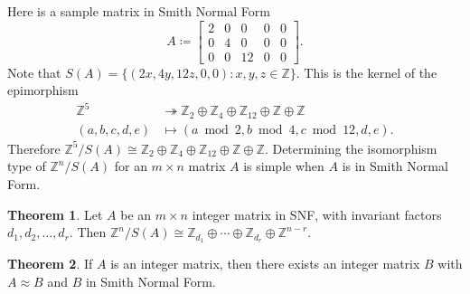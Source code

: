 \documentclass[12pt,a4paper,answers]{exam}
\newcommand{\Z}{\mathbb{Z}}
\theoremstyle{definition}
\newtheorem{theorem}{Theorem}[section]
\begin{document}
Here is a sample matrix in Smith Normal Form
\[ A \coloneqq
  \begin{bmatrix}
    2 & 0 & 0 & 0 & 0 \\
    0 & 4 & 0 & 0 & 0 \\
    0 & 0 & 12 & 0 & 0
  \end{bmatrix}.
\]
Note that $S(A)=\{(2x,4y,12z,0,0) : x,y,z\in\Z\}$. This is the kernel of the epimorphism
\begin{align*}
  \Z^5 &\twoheadrightarrow \Z_2\oplus\Z_4\oplus\Z_{12}\oplus\Z\oplus\Z \\
  (a,b,c,d,e) &\mapsto (a\bmod 2, b\bmod 4, c\bmod 12, d, e).
\end{align*}
Therefore $\Z^5/S(A)\cong\Z_2\oplus\Z_4\oplus\Z_{12}\oplus\Z\oplus\Z$. Determining the isomorphism type of $\Z^n/S(A)$ for an $m\times n$ matrix $A$ is simple when $A$ is in Smith Normal Form.

\begin{theorem}
  \label{decomposition}
  Let $A$ be an $m\times n$ integer matrix in SNF, with invariant factors $d_1,d_2,\ldots,d_r$. Then $\Z^n/S(A)\cong\Z_{d_1}\oplus\cdots\oplus\Z_{d_r}\oplus\Z^{n-r}$.
\end{theorem}

\begin{theorem}
  \label{SNF-existence}
  If $A$ is an integer matrix, then there exists an integer matrix $B$ with $A\approx B$ and $B$ in Smith Normal Form.
\end{theorem}
\end{document}
